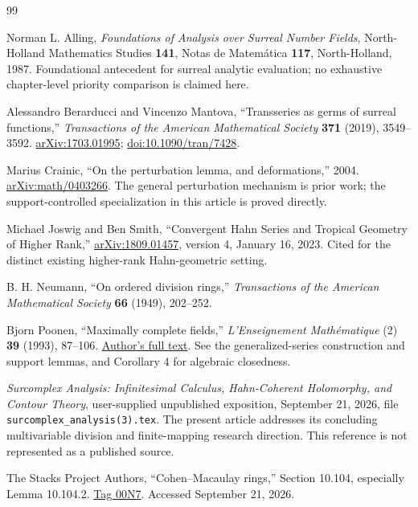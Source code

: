 \documentclass[11pt,letterpaper]{article}
\theoremstyle{definition}
\theoremstyle{remark}
\numberwithin{equation}{section}
\begin{document}
\begin{thebibliography}{99}

Norman L. Alling,
\emph{Foundations of Analysis over Surreal Number Fields},
North-Holland Mathematics Studies \textbf{141}, Notas de Matem\'atica \textbf{117}, North-Holland, 1987.
Foundational antecedent for surreal analytic evaluation; no exhaustive chapter-level priority comparison is claimed here.

Alessandro Berarducci and Vincenzo Mantova,
``Transseries as germs of surreal functions,''
\emph{Transactions of the American Mathematical Society} \textbf{371} (2019), 3549--3592.
\href{https://arxiv.org/abs/1703.01995}{arXiv:1703.01995};
\href{https://doi.org/10.1090/tran/7428}{doi:10.1090/tran/7428}.

Marius Crainic,
``On the perturbation lemma, and deformations,'' 2004.
\href{https://arxiv.org/abs/math/0403266}{arXiv:math/0403266}.
The general perturbation mechanism is prior work; the support-controlled specialization in this article is proved directly.

Michael Joswig and Ben Smith,
``Convergent Hahn Series and Tropical Geometry of Higher Rank,''
\href{https://arxiv.org/abs/1809.01457}{arXiv:1809.01457}, version 4, January 16, 2023.
Cited for the distinct existing higher-rank Hahn-geometric setting.

B. H. Neumann,
``On ordered division rings,''
\emph{Transactions of the American Mathematical Society} \textbf{66} (1949), 202--252.

Bjorn Poonen,
``Maximally complete fields,''
\emph{L'Enseignement Math\'ematique} (2) \textbf{39} (1993), 87--106.
\href{https://math.mit.edu/~poonen/papers/amsval.pdf}{Author's full text}.
See the generalized-series construction and support lemmas, and Corollary 4 for algebraic closedness.

\emph{Surcomplex Analysis: Infinitesimal Calculus, Hahn-Coherent Holomorphy, and Contour Theory},
user-supplied unpublished exposition, September 21, 2026,
file \texttt{surcomplex\_analysis(3).tex}.
The present article addresses its concluding multivariable division and finite-mapping research direction. This reference is not represented as a published source.

The Stacks Project Authors,
``Cohen--Macaulay rings,'' Section 10.104, especially Lemma 10.104.2.
\href{https://stacks.math.columbia.edu/tag/00N7}{Tag 00N7}.
Accessed September 21, 2026.


\end{thebibliography}
\end{document}
